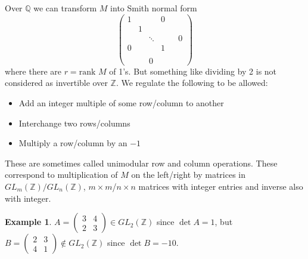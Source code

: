 \documentclass[a4paper]{article}
\newcommand{\rank}{\text{rank }}
\theoremstyle{definition}
\newtheorem{example}[defn]{Example}
\begin{document}
Over $\mathbb Q$ we can transform $ M$ into Smith normal form
\[
\begin{pmatrix}
1 & & & 0\\
& 1 \\
& & \ddots & & & 0 \\
0 & & & 1 \\ \\
& & 0
\end{pmatrix}
\]
where there are $r=\rank M$ of 1's. But something like dividing by 2 is not considered as invertible over $\mathbb Z$. We regulate the following to be allowed:
\begin{itemize}
    \item Add an integer multiple of some row/column to another
    \item Interchange two rows/columns
    \item Multiply a row/column by an $-1$
\end{itemize}
These are sometimes called unimodular row and column operations. These correspond to multiplication of $M$ on the left/right by matrices in $GL_m (\mathbb Z)/GL_n (\mathbb Z)$, $m\times m$/$n\times n$ matrices with integer entries and inverse also with integer.
\begin{example}
$A=\begin{pmatrix}
3 & 4 \\ 2 & 3
\end{pmatrix}\in GL_2 (\mathbb Z)$ since $\det A=1$, but $B=\begin{pmatrix}
    2 & 3 \\ 4 & 1
\end{pmatrix}\notin GL_2 (\mathbb Z)$ since $\det B=-10$.
\end{example}
\end{document}
